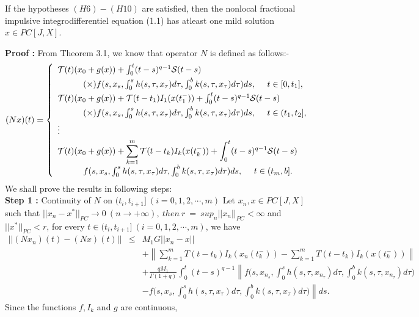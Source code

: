 \documentclass[11pt]{article}
\def \mc{\mathcal}
\begin{document}
\begin{theorem}
If the hypotheses $(H6)-(H10)$ are satisfied, then the  nonlocal fractional impulsive integrodifferentiel equation (1.1) has atleast one mild solution $x\in PC[J,X]$.
\end{theorem}
{\bf Proof :} From Theorem 3.1, we know that operator $N$ is defined as follows:-
\begin{eqnarray}
(Nx)(t)=\left\{\begin{array}{ll}\mc{T}(t)(x_0+g(x)) +\int^t_0(t-s)^{q-1}\mc{S} (t-s)  \\ [3pt] \indent \indent (\times)f(s,x_s,\int^s_0h(s,\tau,x_\tau)d\tau,\int^b_0k(s,\tau,x_\tau)d\tau)ds, \ \ \ \ t\in [0,t_1], \\ [3pt]
\mc{T}(t)(x_0+g(x))+\mc{T}(t-t_1)I_1(x(t_1^-))+\int^t_0(t-s)^{q-1}\mc{S}(t-s)\\ [3pt] \indent \indent (\times)f(s,x_s,\int^s_0h(s,\tau,x_\tau)d\tau,\int^b_0k(s,\tau,x_\tau)d\tau)ds, \ \ \ \ t\in(t_1,t_2], \\ [3pt]
\vdots \\ [3pt]
\mc{T}(t)(x_0+g(x))+\displaystyle \sum_{k=1}^{m} \mc{T}(t-t_k)I_k(x(t_k^-))+\int^t_0(t-s)^{q-1}\mc{S}(t-s)\\ [3pt] \indent \indent f(s,x_s,\int^s_0h(s,\tau,x_\tau)d\tau,\int^b_0k(s,\tau,x_\tau)d\tau)ds, \ \ \ \ t\in(t_m,b].
\end{array}
\right.
\end{eqnarray} 
We shall prove the results in following steps:\\
{\bf Step 1 :} Continuity of $N$ on $(t_i,t_{i+1}] \ (i=0,1,2,\cdots, m)$
Let $x_n,x \in PC[J,X]$ such that $||x_n-x^*||_{PC} \rightarrow 0 \ (n\rightarrow +\infty), \ then \ r \ = \ sup_n||x_n||_{PC}<\infty$ and $||x^*||_{PC}<r$, for every $t\in (t_i,t_{i+1}] \ (i=0,1,2,\cdots,m)$, we have
\begin{eqnarray}
||(Nx_n)(t)-(Nx)(t)||&\leq & M_1G||x_n-x|| \nonumber \\ & &+\left\|\displaystyle \sum_{k=1}^mT(t-t_k)I_k(x_n(t_k^-))-\displaystyle \sum_{k=1}^m T(t-t_k)I_k(x(t_k^-))\right\| \nonumber \\ & &
+\frac{qM_1}{\Gamma(1+q)}\int^t_0 (t-s)^{q-1}\left\|f\Big(s,x_{n_s},\int^s_0h(s,\tau,x_{n_\tau})d\tau,\int^b_0k(s,\tau,x_{n_\tau})d\tau
\Big) \right. \nonumber \\ & & \left. -f\Big(s,x_s,\int^s_0h(s,\tau,x_\tau)d\tau,\int^b_0k(s,\tau,x_\tau)d\tau\Big)\right\|ds.
\end{eqnarray}
Since the functions $f,I_k$ and $g$ are continuous,
\end{document}
